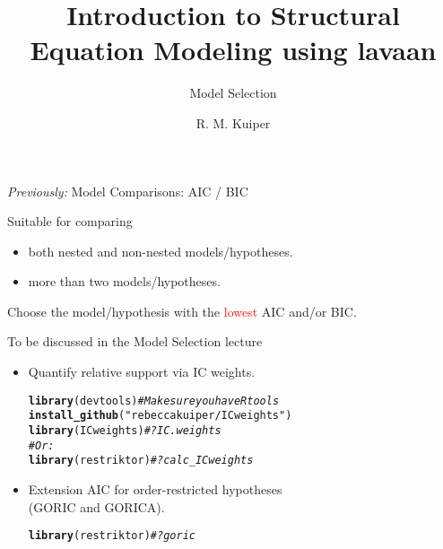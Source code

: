\documentclass[10pt]{beamer}\usepackage[]{graphicx}\usepackage[]{xcolor}
\title{Introduction to Structural Equation Modeling using lavaan}
\subtitle{Model Selection}
\author{R. M. Kuiper}
\institute{Department of Methodology \& Statistics \\ Utrecht University}
\date{}
\makeatletter
\newcommand{\hlsng}[1]{\textcolor[rgb]{0.192,0.494,0.8}{#1}}%
\newcommand{\hlcom}[1]{\textcolor[rgb]{0.678,0.584,0.686}{\textit{#1}}}%
\newcommand{\hldef}[1]{\textcolor[rgb]{0.345,0.345,0.345}{#1}}%
\newcommand{\hlkwd}[1]{\textcolor[rgb]{0.737,0.353,0.396}{\textbf{#1}}}%
\newenvironment{kframe}{%
 \def\at@end@of@kframe{}%
 \ifinner\ifhmode%
  \def\at@end@of@kframe{\end{minipage}}%
  \begin{minipage}{\columnwidth}%
 \fi\fi%
 \def\FrameCommand##1{\hskip\@totalleftmargin \hskip-\fboxsep
 \colorbox{shadecolor}{##1}\hskip-\fboxsep
     \hskip-\linewidth \hskip-\@totalleftmargin \hskip\columnwidth}%
 \MakeFramed {\advance\hsize-\width
   \@totalleftmargin\z@ \linewidth\hsize
   \@setminipage}}%
 {\par\unskip\endMakeFramed%
 \at@end@of@kframe}
\newenvironment{knitrout}{}{} %
\makeatother
\begin{document}



\begin{frame}[t, plain]
  \titlepage
\end{frame}
%
%
\begin{frame}[fragile]{\textit{Previously:} Model Comparisons: AIC / BIC}

Suitable for comparing
\begin{itemize}
  \item both nested and non-nested models/hypotheses.
  \item more than two models/hypotheses.
\end{itemize}

\vspace*{5mm}

Choose the model/hypothesis with the \textcolor{red}{lowest} AIC and/or BIC.

\vspace*{5mm}

To be discussed in the Model Selection lecture
\begin{itemize}
  \item Quantify relative support via IC weights.\\
\begin{knitrout}
\color{fgcolor}\begin{kframe}
\begin{alltt}
\hlkwd{library}\hldef{(devtools)} \hlcom{# Make sure you have Rtools}
\hlkwd{install_github}\hldef{(}\hlsng{"rebeccakuiper/ICweights"}\hldef{)}
\hlkwd{library}\hldef{(ICweights)} \hlcom{# ?IC.weights}
\hlcom{# Or:}
\hlkwd{library}\hldef{(restriktor)} \hlcom{# ?calc_ICweights}
\end{alltt}
\end{kframe}
\end{knitrout}
  \item Extension AIC for order-restricted hypotheses \\ (GORIC and GORICA).\\
\begin{knitrout}
\color{fgcolor}\begin{kframe}
\begin{alltt}
\hlkwd{library}\hldef{(restriktor)} \hlcom{# ?goric}
\end{alltt}
\end{kframe}
\end{knitrout}
\end{itemize}

\end{frame}
\end{document}
